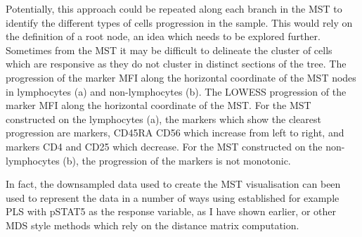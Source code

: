 Potentially, this approach could be repeated along each branch in the \gls{MST} to identify the different types of cells progression in the sample.
This would rely on the definition of a root node, an idea which needs to be explored further.
Sometimes from the MST it may be difficult to delineate the cluster of cells which are responsive as they do not cluster in distinct sections of the tree.
{ The progression of the marker MFI along the horizontal coordinate of the \gls{MST} nodes in lymphocytes (a) and non-lymphocytes (b). }
{
  The LOWESS\citep{Cleveland:1981} progression of the marker MFI along the horizontal coordinate of the \gls{MST}.
  For the \gls{MST} constructed on the lymphocytes (a), the markers which show the clearest progression are markers, CD45RA CD56 which increase from left to right,
  and markers CD4 and CD25 which decrease.
  For the \gls{MST} constructed on the non-lymphocytes (b), the progression of the markers is not monotonic.
}


In fact, the downsampled data used to create the \gls{MST} visualisation can been used to represent the data in a number of ways using established for example \gls{PLS} with pSTAT5 as the response variable, as I have shown earlier, or other \gls{MDS} style methods which rely on the distance matrix computation.  

